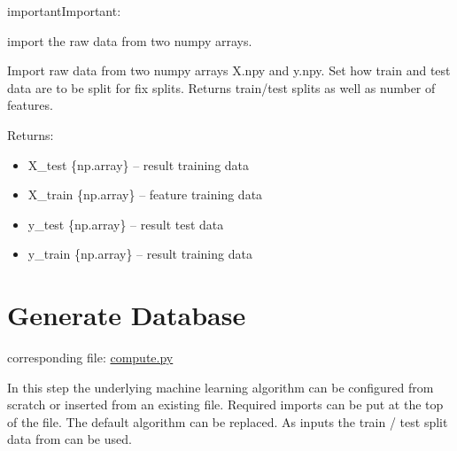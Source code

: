 \documentclass[letterpaper,10pt,english]{sphinxmanual}
\begin{document}
\begin{sphinxadmonition}{important}{Important:}

\begin{fulllineitems}
\label{\detokenize{Importing_Data:ForestFire.import_data.import_data}}
import the raw data from two numpy arrays.

Import raw data from two numpy arrays X.npy and y.npy. 
Set how train and test data are to be split for fix splits.
Returns train/test splits as well as number of features.

Returns:
\begin{itemize}
\item {} 
X\_test \{np.array\} -- result training data

\item {} 
X\_train \{np.array\} -- feature training data

\item {} 
y\_test \{np.array\} -- result test data

\item {} 
y\_train \{np.array\} -- result training data

\end{itemize}

\end{fulllineitems}

\end{sphinxadmonition}
\label{\detokenize{Importing_Data:blank}}\begin{figure}[htbp]
\centering

\noindent{}
\label{\detokenize{Importing_Data:blank}}\end{figure}


\section{Generate Database}
\label{\detokenize{Generate_Database:generate-database}}\label{\detokenize{Generate_Database:compute}}\label{\detokenize{Generate_Database::doc}}
corresponding file: \href{https://github.com/weinertmos/ForestFire/blob/master/source/ForestFire/compute.py}{compute.py}

In this step the underlying machine learning algorithm can be configured from scratch or inserted from an existing file.
Required imports can be put at the top of the file.
The default algorithm can be replaced.
As inputs the train / test split data from {\hyperref[\detokenize{Importing_Data:import-data}]{}} can be used.
\end{document}
